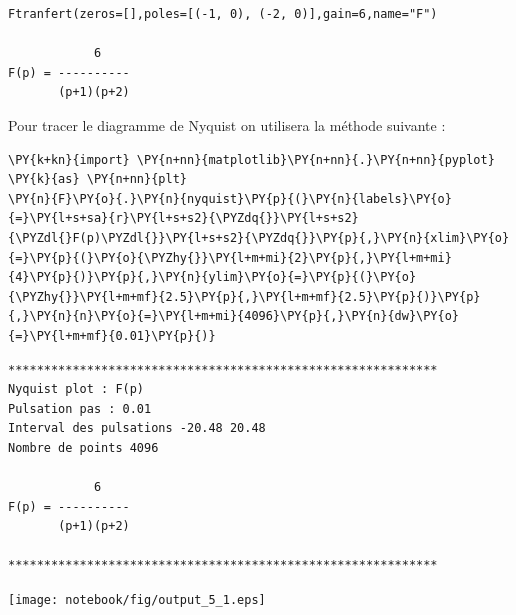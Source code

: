     \begin{Verbatim}[commandchars=\\\{\}]
Ftranfert(zeros=[],poles=[(-1, 0), (-2, 0)],gain=6,name="F")

            6
F(p) = ----------
       (p+1)(p+2)

    \end{Verbatim}

    Pour tracer le diagramme de Nyquist on utilisera la méthode suivante :

    \begin{tcolorbox}[breakable, size=fbox, boxrule=1pt, pad at break*=1mm,colback=cellbackground, colframe=cellborder]
\begin{Verbatim}[commandchars=\\\{\}]
\PY{k+kn}{import} \PY{n+nn}{matplotlib}\PY{n+nn}{.}\PY{n+nn}{pyplot} \PY{k}{as} \PY{n+nn}{plt} 
\PY{n}{F}\PY{o}{.}\PY{n}{nyquist}\PY{p}{(}\PY{n}{labels}\PY{o}{=}\PY{l+s+sa}{r}\PY{l+s+s2}{\PYZdq{}}\PY{l+s+s2}{\PYZdl{}F(p)\PYZdl{}}\PY{l+s+s2}{\PYZdq{}}\PY{p}{,}\PY{n}{xlim}\PY{o}{=}\PY{p}{(}\PY{o}{\PYZhy{}}\PY{l+m+mi}{2}\PY{p}{,}\PY{l+m+mi}{4}\PY{p}{)}\PY{p}{,}\PY{n}{ylim}\PY{o}{=}\PY{p}{(}\PY{o}{\PYZhy{}}\PY{l+m+mf}{2.5}\PY{p}{,}\PY{l+m+mf}{2.5}\PY{p}{)}\PY{p}{,}\PY{n}{n}\PY{o}{=}\PY{l+m+mi}{4096}\PY{p}{,}\PY{n}{dw}\PY{o}{=}\PY{l+m+mf}{0.01}\PY{p}{)}
\end{Verbatim}
\end{tcolorbox}

    \begin{Verbatim}[commandchars=\\\{\}]
************************************************************
Nyquist plot : F(p)
Pulsation pas : 0.01
Interval des pulsations -20.48 20.48
Nombre de points 4096

            6
F(p) = ----------
       (p+1)(p+2)

************************************************************
\end{Verbatim}
\begin{center}
    \texttt{[image: notebook/fig/output\_5\_1.eps]}
\end{center}
